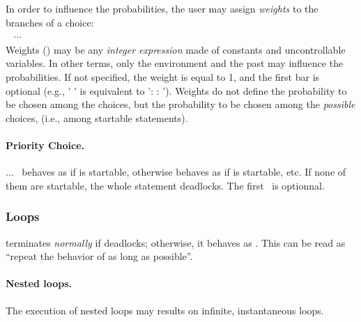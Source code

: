 In order  to influence  the probabilities, the  user may  assign {\em
  weights} to the branches of a choice:\\

\OB 
\BAR {}\COL\  $\cdots$
\BAR {}\COL\ 
\CB \\


Weights  ()  may be  any  {\em  integer  expression} made  of
constants  and uncontrollable  variables.  In  other terms,  only the
environment  and the past  may influence  the probabilities.   If not
specified, the  weight is equal to  1, and the first  bar is optional
(e.g., '\OB {} \BAR {}  \CB' is equivalent to '\OB {}:   :   \CB').  Weights  do not  define the
probability to be chosen among the choices, but the probability to be
chosen  among  the {\em  possible}  choices,  (i.e., among  startable
statements).

\paragraph{Priority Choice.}

 \OB \SBAR {} \SBAR ... \SBAR {} \CB\
behaves as  if  is startable, otherwise
behaves as  if \syn{st2} is startable, etc.
If none of them are startable, the whole statement deadlocks.
The first \SBAR\ is optionnal.


\subsubsection{Loops}


        terminates   {\em  normally}   if  
   deadlocks; otherwise, it  behaves as \syn{st} \key{fby} \key{loop}
   . This can be read as ``repeat the behavior of \syn{st} as
   long as possible''.



\paragraph{Nested loops.}

The execution of nested loops may results on infinite,
instantaneous loops.

